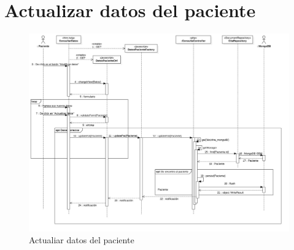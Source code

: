 
\newpage
\section{Actualizar datos del paciente}
\begin{figure}[htbp!]
	\centering
	\includegraphics[width=1\textwidth]{uml/DiagramasSecuencia/AdrianGalindo/actualizarDatosPaciente}
	\caption{Actualiar datos del paciente}
\end{figure}
\newpage
